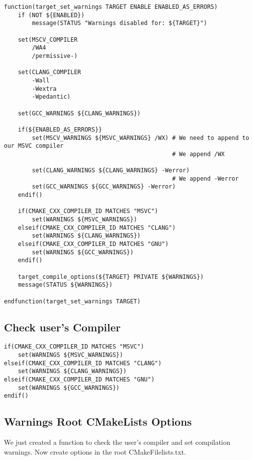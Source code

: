 \begin{verbatim}
function(target_set_warnings TARGET ENABLE ENABLED_AS_ERRORS)
    if (NOT ${ENABLED})
        message(STATUS "Warnings disabled for: ${TARGET}")

    set(MSCV_COMPILER
        /WA4
        /permissive-)

    set(CLANG_COMPILER
        -Wall
        -Wextra
        -Wpedantic)

    set(GCC_WARNINGS ${CLANG_WARNINGS})

    if(${ENABLED_AS_ERRORS}}
        set(MSCV_WARNINGS ${MSVC_WARNINGS} /WX) # We need to append to our MSVC compiler
                                                # We append /WX

        set(CLANG_WARNINGS ${CLANG_WARNINGS} -Werror)
                                                # We append -Werror
        set(GCC_WARNINGS ${GCC_WARNINGS} -Werror)
    endif()

    if(CMAKE_CXX_COMPILER_ID MATCHES "MSVC")
        set(WARNINGS ${MSVC_WARNINGS})
    elseif(CMAKE_CXX_COMPILER_ID MATCHES "CLANG")
        set(WARNINGS ${CLANG_WARNINGS})
    elseif(CMAKE_CXX_COMPILER_ID MATCHES "GNU")
        set(WARNINGS ${GCC_WARNINGS})
    endif()

    target_compile_options(${TARGET} PRIVATE ${WARNINGS})
    message(STATUS ${WARNINGS})

endfunction(target_set_warnings TARGET)
\end{verbatim}

\subsection{Check user's Compiler}

\begin{verbatim}
if(CMAKE_CXX_COMPILER_ID MATCHES "MSVC")
    set(WARNINGS ${MSVC_WARNINGS})
elseif(CMAKE_CXX_COMPILER_ID MATCHES "CLANG")
    set(WARNINGS ${CLANG_WARNINGS})
elseif(CMAKE_CXX_COMPILER_ID MATCHES "GNU")
    set(WARNINGS ${GCC_WARNINGS})
endif()
\end{verbatim}


\subsection{Warnings Root CMakeLists Options}

We just created a function to check the user's compiler and set compilation warnings.
Now create options in the root CMakeFilelists.txt.

